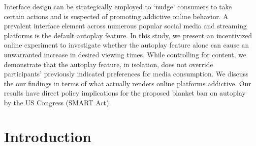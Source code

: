 \documentclass[11pt,a4paper,oneside]{article}
\begin{document}
Interface design can be strategically employed to `nudge' consumers to take certain actions and is suspected of promoting addictive online behavior. A prevalent interface element across numerous popular social media and streaming platforms is the default autoplay feature. In this study, we present an incentivized online experiment to investigate whether the autoplay feature alone can cause an unwarranted increase in  desired viewing times. While controlling for content, we demonstrate that the autoplay feature, in isolation, does not override participants’ previously indicated preferences for media consumption. We discuss the our findings in terms of what actually renders online platforms addictive. Our results have direct policy implications for the proposed blanket ban on autoplay by the US Congress (SMART Act).

\section{Introduction}
\end{document}
